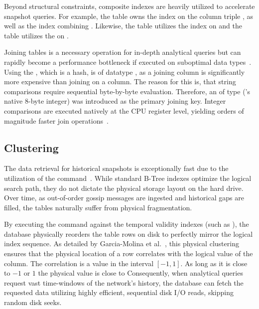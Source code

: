 Beyond structural constraints, composite indexes are heavily utilized to accelerate snapshot queries. 
For example, the  table owns the  index on the column triple , 
as well as the  index combining . 
Likewise, the  table utilizes the  index on 
and the  table utilizes the  on .

Joining tables is a necessary operation for in-depth analytical queries 
but can rapidly become a performance bottleneck if executed on suboptimal data types~\cite[Chapter~15]{garcia-molina_database_2009}.
Using the , which is a  hash, is of datatype , 
as a joining column is significantly more expensive than joining on a  column. 
The reason for this is, that string comparisons require sequential byte-by-byte evaluation. 
Therefore, an  of type  ('s native 8-byte integer) 
was introduced as the primary joining key. 
Integer comparisons are executed natively at the CPU register level, 
yielding orders of magnitude faster join operations~\cite[Chapter~15]{garcia-molina_database_2009}.


\subsection{Clustering}
The data retrieval for historical snapshots is exceptionally fast due to the utilization 
of the   command~\cite{cluster_postgresql_2026}.
While standard B-Tree indexes optimize the logical search path, they do not dictate the physical storage layout on the hard drive. 
Over time, as out-of-order gossip messages are ingested and historical gaps are filled, the tables naturally suffer from physical fragmentation.

By executing the  command against the temporal validity indexes (such as ), 
the database physically reorders the table rows on disk to perfectly mirror the logical index sequence. 
As detailed by Garcia-Molina et al.~\cite[Chapter~13]{garcia-molina_database_2009}, 
this physical clustering ensures that the physical location of a row correlates with the logical value of the  column.
The correlation is a value in the interval $[-1,1]$. 
As long as it is close to $-1$ or $1$ the physical value is close to 
Consequently, when analytical queries request vast time-windows of the network's history, 
the database can fetch the requested data utilizing highly efficient, sequential disk I/O reads, 
skipping random disk seeks.



